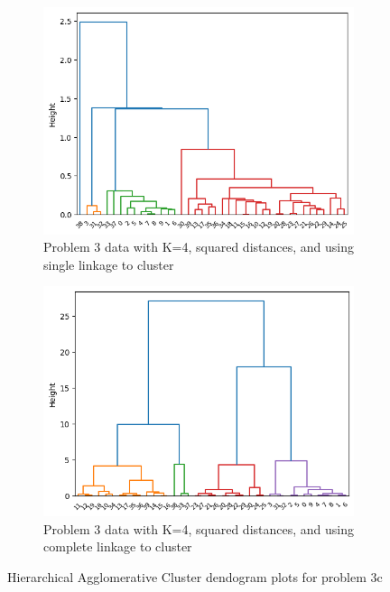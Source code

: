 \documentclass[12pt]{article}
\begin{document}
\begin{figure}
    \begin{subfigure}{0.5\textwidth}
        \centering
        \includegraphics[width=\linewidth]{../plots/3c_single_squared_dendrogram.png}
        \caption{Problem 3 data with K=4, squared distances, and using single linkage to cluster}
    \end{subfigure}
    \begin{subfigure}{0.5\textwidth}
        \centering
        \includegraphics[width=\linewidth]{../plots/3c_complete_squared_dendrogram.png}
        \caption{Problem 3 data with K=4, squared distances, and using complete linkage to cluster}
    \end{subfigure}
    \caption{Hierarchical Agglomerative Cluster dendogram plots for problem 3c}\label{fig:3c_den}
\end{figure}
\end{document}
